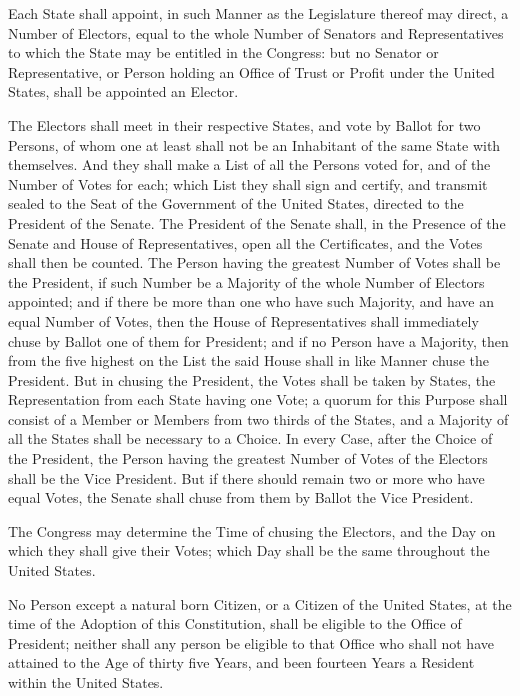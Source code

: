 \documentclass{article}
\begin{document}
Each State shall appoint, in such Manner as the Legislature thereof may
direct, a Number of Electors, equal to the whole Number of Senators and
Representatives to which the State may be entitled in the Congress: but
no Senator or Representative, or Person holding an Office of Trust or
Profit under the United States, shall be appointed an Elector.

The Electors shall meet in their respective States, and vote by Ballot
for two Persons, of whom one at least shall not be an Inhabitant of the
same State with themselves. And they shall make a List of all the
Persons voted for, and of the Number of Votes for each; which List they
shall sign and certify, and transmit sealed to the Seat of the
Government of the United States, directed to the President of the
Senate. The President of the Senate shall, in the Presence of the Senate
and House of Representatives, open all the Certificates, and the Votes
shall then be counted. The Person having the greatest Number of Votes
shall be the President, if such Number be a Majority of the whole Number
of Electors appointed; and if there be more than one who have such
Majority, and have an equal Number of Votes, then the House of
Representatives shall immediately chuse by Ballot one of them for
President; and if no Person have a Majority, then from the five highest
on the List the said House shall in like Manner chuse the President. But
in chusing the President, the Votes shall be taken by States, the
Representation from each State having one Vote; a quorum for this
Purpose shall consist of a Member or Members from two thirds of the
States, and a Majority of all the States shall be necessary to a Choice.
In every Case, after the Choice of the President, the Person having the
greatest Number of Votes of the Electors shall be the Vice President.
But if there should remain two or more who have equal Votes, the Senate
shall chuse from them by Ballot the Vice President.

The Congress may determine the Time of chusing the Electors, and the Day
on which they shall give their Votes; which Day shall be the same
throughout the United States.

No Person except a natural born Citizen, or a Citizen of the United
States, at the time of the Adoption of this Constitution, shall be
eligible to the Office of President; neither shall any person be
eligible to that Office who shall not have attained to the Age of thirty
five Years, and been fourteen Years a Resident within the United States.
\end{document}
